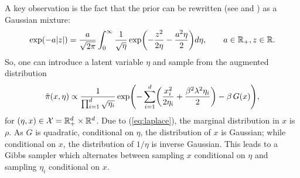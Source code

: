 \documentclass[11pt, twoside]{report}
\begin{document}


A key observation is
 the fact that the prior can be rewritten (see \cite{west1987scale} and \cite{gneiting1997normal}) as a Gaussian mixture:
\begin{equation}\label{eq:laplace}
   \exp\pa{-a\abs{z}} = \frac{a}{ \sqrt{2\pi}}\int_0^\infty \frac{1}{\sqrt{\eta}} \exp\pa{ -\frac{z^2}{2 \eta} - \frac{a^2 \eta}{2}} d\eta, \qquad a\in \real_+,z\in\real.
\end{equation}
So, one can introduce a latent variable $\eta$ and sample from the augmented distribution
\begin{equation}\label{eq:gibbs}
    \tilde \pi(x,\eta) \propto \frac{1}{\prod_{i=1}^d \sqrt{\eta_i}} \exp\Biggl( - \sum_{i=1}^d\pa{\frac{x_i^2}{2\eta_i} + \frac{\beta^2 \lambda^2 \eta_i }{2 }} - \beta \,G(x)\Biggr),
\end{equation}
for $(\eta,x)\in \mathcal X=\mathbb{R}_+^d\times \mathbb{R}^d$.
Due to (\ref{eq:laplace}), the marginal distribution in $x$ is $\rho$. As $G$ is quadratic, conditional on $\eta$,  the distribution of $x$ is  Gaussian; while conditional on $x$, the distribution of $1/\eta$ is  inverse Gaussian.
This leads to a Gibbs sampler which alternates between sampling $x$ conditional on $\eta$  and sampling $\eta_i$ conditional on $x$.
\end{document}
